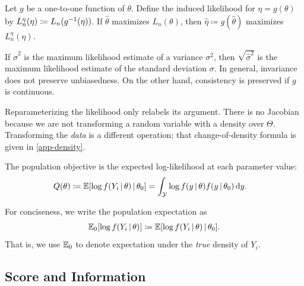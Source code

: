 \documentclass[a4paper,12pt]{article}
\begin{document}
\begin{proposition}
	Let $g$ be a one-to-one function of $\theta$.
	Define the induced likelihood for $\eta=g(\theta)$ by $L_n^\eta(\eta)\coloneqq L_n(g^{-1}(\eta))$.
	If $\widehat\theta$ maximizes $L_n(\theta)$,
	then $\widehat\eta\coloneqq g(\widehat\theta)$ maximizes $L_n^\eta(\eta)$.
\end{proposition}

\begin{remark}
	If $\widehat \sigma^2$ is the maximum likelihood estimate of a variance $\sigma^2$,
	then $\sqrt{\widehat \sigma^2}$ is the maximum likelihood estimate of the standard deviation $\sigma$.
	In general, invariance does not preserve unbiasedness.
	On the other hand, consistency is preserved if $g$ is continuous.
\end{remark}

\begin{remark}
	Reparameterizing the likelihood only relabels its argument.
	There is no Jacobian because we are not transforming a random variable with a density over $\Theta$.
	Transforming the \emph{data} is a different operation;
	that change-of-density formula is given in \autoref{app-density}.
\end{remark}

\begin{definition}\label{def-population-objective}
	The population objective is the expected log-likelihood at each parameter value:
	\begin{align}
		Q(\theta)
		&\coloneqq \operatorname{\mathbb{E}}[\log f(Y_i\mathpunct{}|\mathpunct{}\theta)\mathpunct{}|\mathpunct{}\theta_0]
		= \int_{\mathcal{Y}} \log f(y\mathpunct{}|\mathpunct{}\theta)f(y\mathpunct{}|\mathpunct{}\theta_0)\mathop{}\!{\mathrm{d}} y.
	\end{align}
\end{definition}

\begin{remark}
	For conciseness, we write the population expectation as
	\begin{align}
		\operatorname{\mathbb{E}}_0[\log f(Y_i\mathpunct{}|\mathpunct{}\theta)]
		\coloneqq \operatorname{\mathbb{E}}[\log f(Y_i\mathpunct{}|\mathpunct{}\theta)\mathpunct{}|\mathpunct{}\theta_0].
	\end{align}
	That is, we use $\operatorname{\mathbb{E}}_0$ to denote expectation under the \emph{true} density of $Y_i$.
\end{remark}

\subsection{Score and Information}
\end{document}

